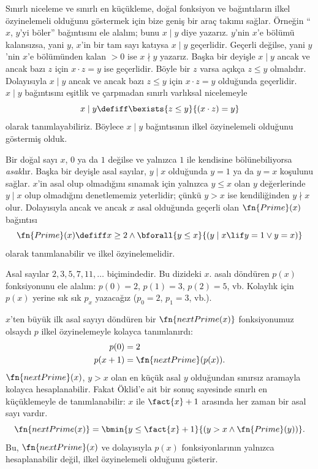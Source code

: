 \documentclass[../../../include/open-logic-section]{subfiles}
\begin{document}

Sınırlı niceleme ve sınırlı en küçükleme, doğal fonksiyon ve bağıntıların
ilkel özyinelemeli olduğunu göstermek için bize geniş bir araç takımı sağlar.
Örneğin ``$x$, $y$'yi böler'' bağıntısını ele alalım; bunu $x\mid y$ diye
yazarız. $y$'nin $x$'e bölümü kalansızsa, yani $y$, $x$'in bir tam sayı
katıysa $x\mid y$ geçerlidir. Geçerli değilse, yani $y$'nin $x$'e bölümünden
kalan $>0$ ise $x\nmid y$ yazarız. Başka bir deyişle $x\mid y$ ancak ve
ancak bazı $z$ için $x\cdot z=y$ ise geçerlidir. Böyle bir $z$ varsa açıkça
$z\leq y$ olmalıdır. Dolayısıyla $x\mid y$ ancak ve ancak bazı $z\leq y$
için $x\cdot z=y$ olduğunda geçerlidir. $x\mid y$ bağıntısını eşitlik ve
çarpmadan sınırlı varlıksal nicelemeyle
\[
  x\mid y\defiff\bexists{z\leq y}{(x\cdot z)=y}
\]
olarak tanımlayabiliriz. Böylece $x\mid y$ bağıntısının ilkel özyinelemeli
olduğunu göstermiş olduk.

Bir doğal sayı $x$, $0$ ya da $1$ değilse ve yalnızca $1$ ile kendisine
bölünebiliyorsa \emph{asal}dır. Başka bir deyişle asal sayılar, $y\mid x$
olduğunda $y=1$ ya da $y=x$ koşulunu sağlar. $x$'in asal olup olmadığını
sınamak için yalnızca $y\leq x$ olan $y$ değerlerinde $y\mid x$ olup
olmadığını denetlememiz yeterlidir; çünkü $y>x$ ise kendiliğinden
$y\nmid x$ olur. Dolayısıyla ancak ve ancak $x$ asal olduğunda geçerli olan
$\fn{Prime}(x)$ bağıntısı
\[
  \fn{Prime}(x)\defiff x\geq2\land
  \bforall{y\leq x}{(y\mid x\lif y=1\lor y=x)}
\]
olarak tanımlanabilir ve ilkel özyinelemelidir.

Asal sayılar $2,3,5,7,11,\dots$ biçimindedir. Bu dizideki $x$. asalı
döndüren $p(x)$ fonksiyonunu ele alalım: $p(0)=2$, $p(1)=3$,
$p(2)=5$, vb. Kolaylık için $p(x)$ yerine sık sık $p_x$ yazacağız
($p_0=2$, $p_1=3$, vb.).

$x$'ten büyük ilk asal sayıyı döndüren bir $\fn{nextPrime(x)}$ fonksiyonumuz
olsaydı $p$ ilkel özyinelemeyle kolayca tanımlanırdı:
\begin{align*}
  p(0) & = 2\\
  p(x+1) & = \fn{nextPrime}(p(x)).
\end{align*}
$\fn{nextPrime}(x)$, $y>x$ olan en küçük asal $y$ olduğundan sınırsız
aramayla kolayca hesaplanabilir. Fakat Öklid'e ait bir sonuç sayesinde
sınırlı en küçüklemeyle de tanımlanabilir: $x$ ile $\fact{x}+1$ arasında
her zaman bir asal sayı vardır.
\[
  \fn{nextPrime(x)}=
  \bmin{y\leq\fact{x}+1}{(y>x\land\fn{Prime}(y))}.
\]
Bu, $\fn{nextPrime}(x)$ ve dolayısıyla $p(x)$ fonksiyonlarının yalnızca
hesaplanabilir değil, ilkel özyinelemeli olduğunu gösterir.
\end{document}
